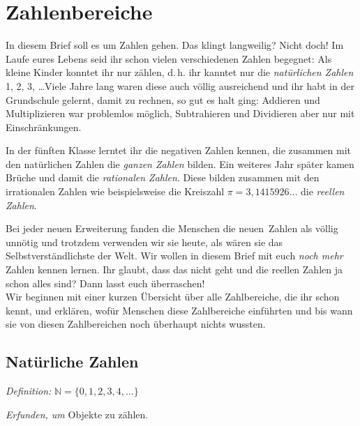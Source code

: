 \documentclass{zirkelblatt1415}
\renewcommand{\NN}{\mathbb{N}}
\begin{document}

\tableofcontents

\section{Zahlenbereiche}

In diesem Brief soll es um Zahlen gehen. Das klingt langweilig? Nicht doch! Im Laufe eures Lebens seid ihr schon vielen verschiedenen Zahlen begegnet: Als kleine Kinder konntet ihr nur zählen, d.\,h. ihr kanntet nur die \emph{nat\"urlichen Zahlen} 1, 2, 3, \ldots Viele Jahre lang waren diese auch v\"ollig ausreichend und ihr habt in der Grundschule gelernt, damit zu rechnen, so gut es halt ging: Addieren und Multiplizieren war problemlos m\"oglich, Subtrahieren und Dividieren aber nur mit Einschr\"ankungen.

In der f\"unften Klasse lerntet %
ihr die negativen Zahlen kennen, die zusammen mit den natürlichen Zahlen die \emph{ganzen Zahlen} bilden. Ein weiteres Jahr sp\"ater kamen Br\"uche und damit die \emph{rationalen Zahlen}. Diese bilden zusammen mit den irrationalen Zahlen wie beispielsweise die Kreiszahl $\pi=3{,}1415926\ldots$ die \emph{reellen Zahlen}.

Bei jeder neuen Erweiterung fanden die Menschen die \glqq neuen\grqq\ Zahlen als v\"ollig unn\"otig und trotzdem verwenden wir sie heute, als w\"aren sie das Selbstverst\"andlichste der Welt. Wir wollen in diesem Brief mit euch \emph{noch mehr} Zahlen kennen lernen. Ihr glaubt, dass das nicht geht und die reellen Zahlen ja schon alles sind? Dann lasst euch \"uberraschen!
\medskip \\
Wir beginnen mit einer kurzen \"Ubersicht \"uber alle Zahlbereiche, die ihr schon kennt, und erkl\"aren, wof\"ur Menschen diese Zahlbereiche einf\"uhrten und bis wann sie von diesen Zahlbereichen noch \"uberhaupt nichts wussten.

\subsection{Natürliche Zahlen}

\emph{Definition:} $\NN=\{0,1,2,3,4,\ldots\}$

\emph{Erfunden, um} Objekte zu zählen.
\end{document}
